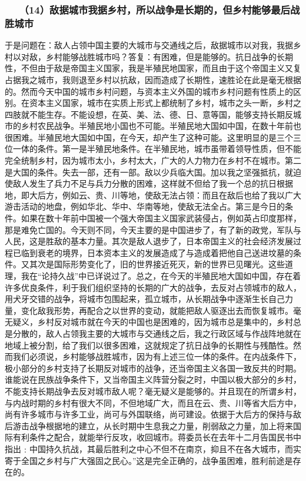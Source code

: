 \documentclass[cn,11pt,chinese]{elegantbook}
\def\myformat#1{\hfil\hfil #1}
\begin{document}
\subsubsection*{\myformat{　　（14）敌据城市我据乡村，所以战争是长期的，但乡村能够最后战胜城市}}
于是问题在：敌人占领中国主要的大城市与交通线之后，敌据城市以对我，我据乡村以对敌，乡村能够战胜城市吗？答复：有困难，但是能够的。抗日战争的长期性，不但由于敌是帝国主义国家，我是半殖民地国家，而且由于这个帝国主义又复占据我之城市，我则退至乡村以抗敌，因而造成了长期性，速胜论在此是毫无根据的。然而今天中国的城市乡村问题，与资本主义外国的城市乡村问题有性质上的区别。在资本主义国家，城市在实质上形式上都统制了乡村，城市之头一断，乡村之四肢就不能生存。不能设想，在英、美、法、德、日、意等国，能够支持长期反城市的乡村农民战争。半殖民地小国也不可能。半殖民地大国如中国，在数十年前也很困难。半殖民地大国如中国，在今天，却产生了这种可能。这里明显的是三个三位一体的条件。第一是半殖民地条件。在半殖民地，城市虽带着领导性质，但不能完全统制乡村，因为城市太小，乡村太大，广大的人力物力在乡村不在城市。第二是大国的条件。失去一部，还有一部。敌以少兵临大国。加以我之坚强抵抗，就迫使敌人发生了兵力不足与兵力分散的困难，这样就不但给了我一个总的抗日根据地，即大后方，例如云、贵、川等地，使敌无法占领：而且在敌后也给了我以广大游击活动的地盘，例如华北、华中、华南等地，使敌无法全占。第三是今日的条件。如果在数十年前中国被一个强大帝国主义国家武装侵占，例如英占印度那样，那是难免亡国的。今天则不同，今天主要的是中国进步了，有了新的政党，军队与人民，这是胜敌的基本力量。其次是敌人退步了，日本帝国主义的社会经济发展过程已临到衰老的境界，日本资本主义的发展造成了与造成着把他自己送进坟墓的条件。又其次是国际形势变化了，旧的世界接近死灭，新的世界已见曙光。这些道理，我在“论持久战”中已详说过了。总之，在今天的半殖民地大国如中国，存在着许多优良条件，利于我们组织坚持的长期的广大的战争，去反对占领城市的敌人，用犬牙交错的战争，将城市包围起来，孤立城市，从长期战争中逐渐生长自己力量，变化敌我形势，再配合之以世界的变动，就能把敌人驱逐出去而恢复城市。毫无疑义，乡村反对城市就在今天的中国也是困难的，因为城市总是集中的，乡村总是分散的，敌人占领我主要的大城市与交通线之后，我之行政区域与作战阵地就在地域上被分割，给了我们以很多困难，这就规定了抗日战争的长期性与残酷性。然而我们必须说，乡村能够战胜城市，因为有上述三位一体的条件。在内战条件下，极小部分的乡村支持了长期反对城市的战争，还当帝国主义各国一致反共的时期。谁能说在民族战争条件下，又当帝国主义阵营分裂之时，中国以极大部分的乡村，不能支持长期战争去反对城市敌人呢？毫无疑义是能够的。并且现在的所谓乡村，与内战时期的乡村有很大不同，不但地域广大，而且在云、贵、川等省大后方中，尚有许多城市与许多工业，尚可与外国联络，尚可建设。依据于大后方的保持与敌后游击战争根据地的建立，从长时期中生息我之力量，削弱敌之力量，加上将来国际有利条件之配合，就能举行反攻，收回城市。蒋委员长在去年十二月告国民书中指出﹕中国持久抗战，其最后胜利之中心不但不在南京，抑且不在各大城市，而实寄于全国之乡村与广大强固之民心。”这是完全正确的，战争虽困难，胜利前途是存在的。\\
\end{document}
